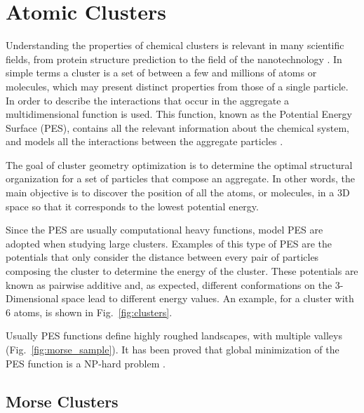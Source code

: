 \chapter{Atomic Clusters}

Understanding the properties of chemical clusters is relevant in many scientific fields, from protein structure prediction to the field of the nanotechnology \cite{wales98}. In simple terms a cluster is a set of between a few and millions of atoms or molecules, which may present distinct properties from those of a single particle. In order to describe the interactions that occur in the aggregate a multidimensional function is used. This function, known as the Potential Energy Surface (PES), contains all the relevant information about the chemical system, and models all the interactions between the aggregate particles \cite{doye06}.

The goal of cluster geometry optimization is to determine the optimal structural organization for a set of particles that compose an aggregate. In other words, the main objective is to discover the position of all the atoms, or molecules, in a 3D space so that it corresponds to the lowest potential energy.

Since the PES are usually computational heavy functions, model PES are adopted when studying large clusters. Examples of this type of PES are the potentials that only consider the distance between every pair of particles composing the cluster to determine the energy of the cluster. These potentials are known  as pairwise additive and, as expected, different conformations on the 3-Dimensional space lead to different energy values. An example, for a cluster with 6 atoms, is shown in Fig.~\ref{fig:clusters}.


\pagebreak

Usually PES functions define highly roughed landscapes, with multiple valleys (Fig.~\ref{fig:morse_sample}). It has been proved that global minimization of the PES function is a NP-hard problem \cite{doye98}.




	\section{Morse Clusters}
	
